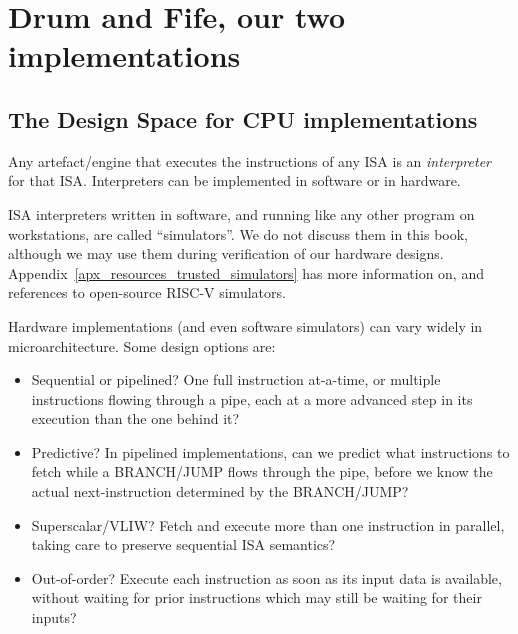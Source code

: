 \vspace{1ex}



\section{Drum and Fife, our two implementations}

\label{Sec_Drum_and_Fife}


\subsection{The Design Space for CPU implementations}

Any artefact/engine that executes the instructions of any ISA is an
\emph{interpreter} for that ISA.  Interpreters can be implemented in
software or in hardware.

ISA interpreters written in software, and running like any other
program on workstations, are called ``simulators''.  We do not discuss
them in this book, although we may use them during verification of our
hardware designs.  Appendix~\ref{apx_resources_trusted_simulators} has
more information on, and references to open-source RISC-V simulators.

Hardware implementations (and even software simulators) can vary
widely in microarchitecture.  Some design options are:

\begin{itemize}

  \item Sequential or pipelined?  One full instruction at-a-time, or
    multiple instructions flowing through a pipe, each at a more
    advanced step in its execution than the one behind it?

  \item Predictive? In pipelined implementations, can we predict what
    instructions to fetch while a BRANCH/JUMP flows through the pipe,
    before we know the actual next-instruction determined by the
    BRANCH/JUMP?

  \item Superscalar/VLIW? Fetch and execute more than one instruction
    in parallel, taking care to preserve sequential ISA semantics?

  \item Out-of-order? Execute each instruction as soon as its input
    data is available, without waiting for prior instructions which
    may still be waiting for their inputs?

\end{itemize}

